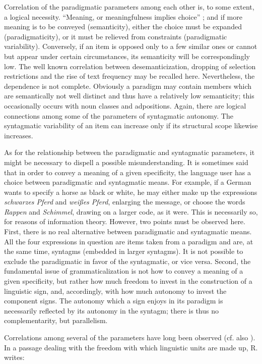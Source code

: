 Correlation of the paradigmatic parameters among each other is, to some extent, a logical necessity. “Meaning, or meaningfulness implies choice” \citep[33]{Lyons1977}; and if more meaning is to be conveyed (semanticity), either the choice must be expanded (paradigmaticity), or it must be relieved from constraints (paradigmatic variability). Conversely, if an item is opposed only to a few similar ones or cannot but appear under certain circumstances, its semanticity will be correspondingly low. The well known correlation between desemanticization, dropping of selection restrictions and the rise of text frequency may be recalled here. Nevertheless, the dependence is not complete. Obviously a paradigm may contain members which are semantically not well distinct and thus have a relatively low semanticity; this occasionally occurs with noun classes and adpositions. Again, there are logical connections among some of the parameters of syntagmatic autonomy. The syntagmatic variability of an item can increase only if its structural scope likewise increases.

As for the relationship between the paradigmatic and syntagmatic parameters, it might be necessary to dispell a possible misunderstanding. It is sometimes said that in order to convey a meaning of a given specificity, the language user has a choice between paradigmatic and syntagmatic means. For example, if a German wants to specify a horse as black or white, he may either make up the expressions \textit{schwarzes Pferd} and \textit{weißes Pferd}, enlarging the message, or choose the words \textit{Rappen} and \textit{Schimmel}, drawing on a larger code, as it were. This is necessarily so, for reasons of information theory. However, two points must be observed here. First, there is no real alternative between paradigmatic and syntagmatic means. All the four expressions in question are items taken from a paradigm and are, at the same time, syntagms (embedded in larger syntagms). It is not possible to exclude the paradigmatic in favor of the syntagmatic, or vice versa. Second, the fundamental issue of grammaticalization is not how to convey a meaning of a given specificity, but rather how much freedom to invest in the construction of a linguistic sign, and, accordingly, with how much autonomy to invest the component signs. The autonomy which a sign enjoys in its paradigm is necessarily reflected by its autonomy in the syntagm; there is thus no complementarity, but parallelism.

Correlations among several of the parameters have long been observed (cf. also \citealt[62--68]{HeineEtAl1984}). In a passage dealing with the freedom with which linguistic units are made up, R. \citet{Jakobson1956} writes:

